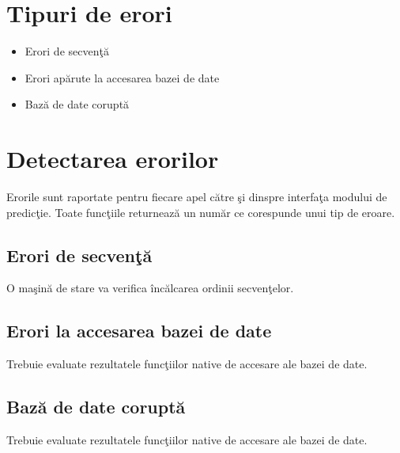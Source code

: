 \label{cap5}


\label{Chapter5} %

\thispagestyle{fancy}


\section{Tipuri de erori} 
\begin{itemize}
 \setlength\itemsep{0em}
	\item Erori de secvenţă
	\item Erori apărute la accesarea bazei de date
	\item Bază de date coruptă
\end{itemize}


\section{Detectarea erorilor}
Erorile sunt raportate pentru fiecare apel către şi dinspre interfaţa modului de predicţie. Toate funcţiile returnează un număr ce corespunde unui tip de eroare.

	\subsection{Erori de secvenţă}
	O maşină de stare va verifica încălcarea ordinii secvenţelor.
	
	\subsection{Erori la accesarea bazei de date}
	Trebuie evaluate rezultatele funcţiilor native de accesare ale bazei de date.

	\subsection{Bază de date coruptă}
	Trebuie evaluate rezultatele funcţiilor native de accesare ale bazei de date.

